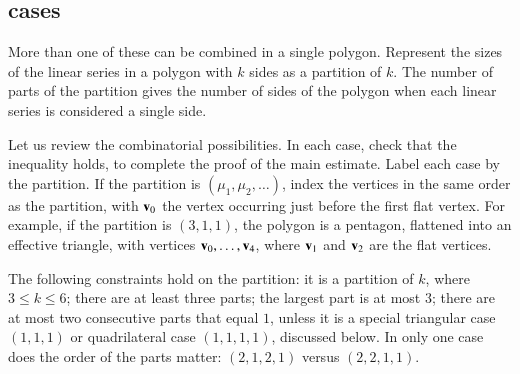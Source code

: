 
\subsection{cases}

More than one of these can be combined in a single polygon.   Represent the sizes of the linear series in a polygon with $k$ sides as a partition of $k$.
The number of parts of the partition gives the number of sides of the polygon when each linear series is considered a single side. 
%

Let us review the combinatorial possibilities.  In each case,  check that the inequality holds, to complete the proof of the main estimate.  Label each 
case by the partition.  If the partition is $(\mu_1,\mu_2,\ldots)$, 
index the vertices in the same order as the partition, with ${\mathbf v}_0$
the vertex occurring just before the first flat vertex.  For example,
if the partition is $(3,1,1)$, the polygon is a pentagon, flattened into
an effective triangle, with vertices ${\mathbf v}_0,\ldots,{\mathbf v}_4$, where ${\mathbf v}_1$ and ${\mathbf v}_2$
are the flat vertices.
%

The following constraints hold on the partition: it is
a partition of $k$, where $3\le k\le 6$; there
are at least three parts; the largest part is at most $3$;  there are
at most two consecutive parts that equal $1$, unless it is a special triangular case $(1,1,1)$ or
quadrilateral case $(1,1,1,1)$, discussed below.  In only one case
does the order of the parts matter: $(2,1,2,1)$ versus $(2,2,1,1)$.

